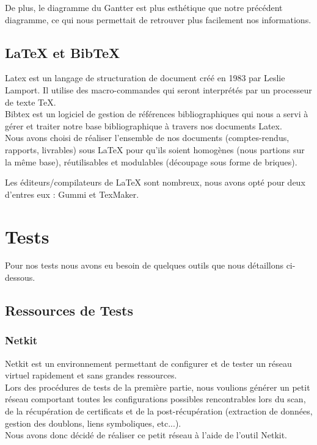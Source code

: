 De plus, le diagramme du Gantter est plus esthétique que notre précédent diagramme, ce qui nous permettait de retrouver plus facilement nos informations.

\subsection{LaTeX et BibTeX}

Latex est un langage de structuration de document créé en 1983 par Leslie Lamport. Il utilise des macro-commandes qui seront interprétés par un processeur de texte TeX.\\
Bibtex est un logiciel de gestion de références bibliographiques qui nous a servi à gérer et traiter notre base bibliographique à travers nos documents Latex.\\

Nous avons choisi de réaliser l'ensemble de nos documents (comptes-rendus, rapports, livrables) sous LaTeX pour qu'ils soient homogènes (nous partions sur la même base), réutilisables et modulables (découpage sous forme de briques).

Les éditeurs/compilateurs de LaTeX sont nombreux, nous avons opté pour deux d'entres eux : Gummi et TexMaker.

\section{Tests}

Pour nos tests nous avons eu besoin de quelques outils que nous détaillons ci-dessous.

\subsection{Ressources de Tests}
\subsubsection{Netkit}

Netkit est un environnement permettant de configurer et de tester un réseau virtuel rapidement et sans grandes ressources.\\
Lors des procédures de tests de la première partie, nous voulions générer un petit réseau comportant toutes les configurations possibles rencontrables lors du scan, de la récupération de certificats et de la post-récupération (extraction de données, gestion des doublons, liens symboliques, etc...).\\
Nous avons donc décidé de réaliser ce petit réseau à l'aide de l'outil Netkit.

